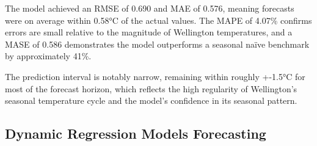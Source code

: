 \documentclass[11pt, a4paper]{article}\usepackage[]{graphicx}\usepackage[]{xcolor}
\begin{document}
The model achieved an RMSE of 0.690 and MAE of 0.576, meaning forecasts were on average within 0.58°C of the actual values. The MAPE of 4.07\% confirms errors are small relative to the magnitude of Wellington temperatures, and a MASE of 0.586 demonstrates the model outperforms a seasonal naïve benchmark by approximately 41\%.

The prediction interval is notably narrow, remaining within roughly +-1.5°C for most of the forecast horizon, which reflects the high regularity of Wellington's seasonal temperature cycle and the model's confidence in its seasonal pattern.

\subsection{Dynamic Regression Models Forecasting}
\end{document}
